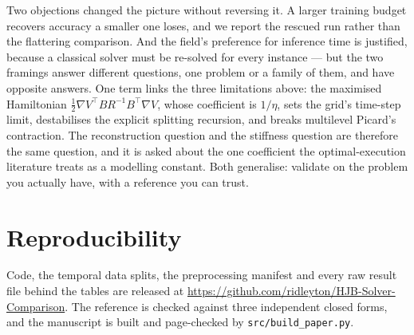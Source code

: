 \documentclass[conference]{IEEEtran}
\newcommand{\repourl}{\url{https://github.com/ridleyton/HJB-Solver-Comparison}}
\begin{document}
Two objections changed the picture without reversing it. A larger training budget recovers accuracy
a smaller one loses, and we report the rescued run rather than the flattering comparison. And the
field's preference for inference time is justified, because a classical solver must be re-solved for
every instance --- but the two framings answer different questions, one problem or a family of them,
and have opposite answers. One term links the three limitations above: the maximised Hamiltonian
$\tfrac12\nabla V^\top BR^{-1}B^\top\nabla V$, whose coefficient is $1/\eta$, sets the grid's
time-step limit, destabilises the explicit splitting recursion, and breaks multilevel Picard's
contraction. The reconstruction question and the stiffness question are therefore the same question,
and it is asked about the one coefficient the optimal-execution literature treats as a modelling
constant. Both generalise: validate on the problem you actually have, with a reference you can trust.

\section*{Reproducibility}
Code, the temporal data splits, the preprocessing manifest and every raw result file behind the
tables are released at \repourl. The reference is checked against three
independent closed forms, and the manuscript is built and page-checked by
\texttt{src/build\_paper.py}.



\end{document}
